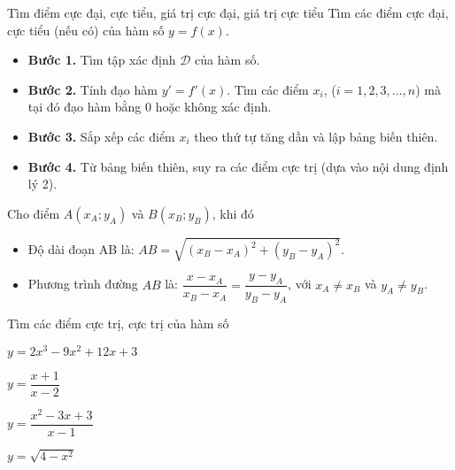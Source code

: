 \begin{dang}{Tìm điểm cực đại, cực tiểu, giá trị cực đại, giá trị cực tiểu}
 Tìm các điểm cực đại, cực tiểu (nếu có) của hàm số $y=f(x)$.
 \begin{itemize}
 \item \textbf{Bước 1.} Tìm tập xác định $\mathscr{D}$ của hàm số.
 \item \textbf{Bước 2.} Tính đạo hàm $y'=f'(x)$. Tìm các điểm $x_i$, ($i=1,2,3,\ldots,n$) mà tại đó đạo hàm bằng $0$ hoặc không xác định.
 \item\textbf{Bước 3.} Sắp xếp các điểm $x_i$ theo thứ tự tăng dần và lập bảng biến thiên.
 \item \textbf{Bước 4.} Từ bảng biến thiên, suy ra các điểm cực trị (dựa vào nội dung định lý 2).
 \end{itemize}
 \begin{note}
 Cho điểm $A(x_A;y_A)$ và $B(x_B;y_B)$, khi đó
 \begin{itemize}
 \item Độ dài đoạn AB là: $AB=\sqrt{(x_B-x_A)^2 + (y_B-y_A)^2}$.
 \item Phương trình đường $AB$ là: $\dfrac{x-x_A}{x_B-x_A} = \dfrac{y-y_A}{y_B-y_A}$, với $x_A \ne x_B$ và $y_A \ne y_B$.
 \end{itemize}
 \end{note}
\end{dang}
\begin{vd} Tìm các điểm cực trị, cực trị của hàm số
 \begin{listEX}[2]
 \item $y=2x^3-9x^2+12x+3$
 \item $y=\dfrac{x+1}{x-2}$
 \item $y=\dfrac{x^2-3x+3}{x-1}$
 \item $y=\sqrt{4-x^2}$
 \end{listEX}
 \loigiai{}
\end{vd}
